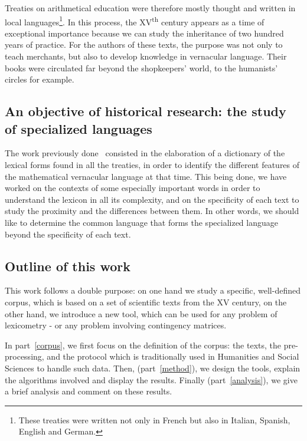 \documentclass[preprint]{elsarticle}
\begin{document}

Treaties on arithmetical education were therefore mostly thought and written in local languages\footnote{These treaties were written not only in French but also in Italian, Spanish, English and German.}. In this process, the XV\textsuperscript{th} century appears as a time of exceptional importance because we can study the inheritance of two hundred years of practice. For the authors of these texts, the purpose was not only to teach merchants, but also to develop knowledge in vernacular language. Their books were circulated far beyond the shopkeepers' world, to the humanists' circles for example.

\subsection*{An objective of historical research: the study of specialized languages}

The work previously done~\cite{lamasse2012} consisted in the elaboration of a dictionary of the lexical forms found in all the treaties, in order to identify the different features of the mathematical vernacular language at that time. This being done, we have worked on the contexts of some especially important words in order to understand the lexicon in all its complexity, and on the specificity of each text to study the proximity and the differences between them. In other words, we should like to determine the common language that forms the specialized language beyond the specificity of each text.

\subsection*{Outline of this work}

This work follows a double purpose: on one hand we study a specific, well-defined corpus, which is based on a set of scientific texts from the XV century, on the other hand, we introduce a new tool, which can be used for any problem of lexicometry - or any problem involving contingency matrices.

In part~\ref{corpus}, we first focus on the definition of the corpus: the texts, the pre-processing, and the protocol which is traditionally used in Humanities and Social Sciences to handle such data. Then, (part~\ref{method}), we design the tools, explain the algorithms involved and display the results. Finally (part~\ref{analysis}), we give a brief analysis and comment on these results.
\end{document}
